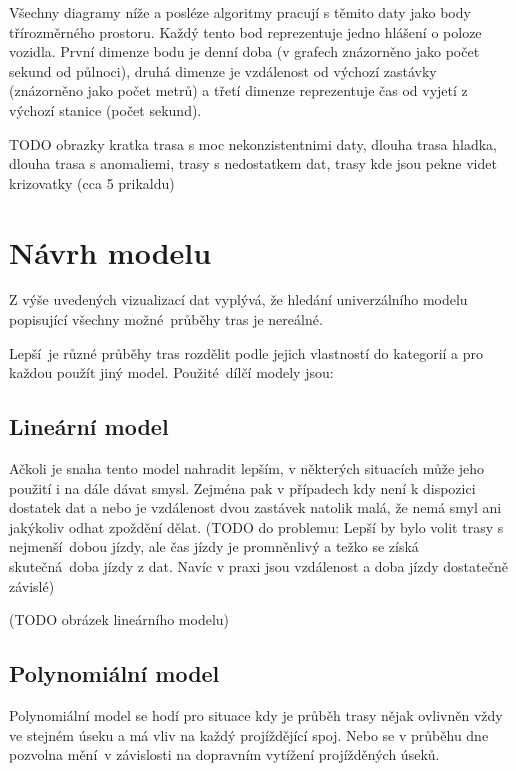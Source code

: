 \bigbreak

Všechny diagramy níže a posléze algoritmy pracují s těmito daty jako body třírozměrného prostoru. Každý tento bod reprezentuje jedno hlášení o poloze vozidla. První dimenze bodu je denní doba (v grafech znázorněno jako počet sekund od půlnoci), druhá dimenze je vzdálenost od výchozí zastávky (znázorněno jako počet metrů) a třetí dimenze reprezentuje čas od vyjetí z výchozí stanice (počet sekund).

TODO obrazky kratka trasa s moc nekonzistentnimi daty, dlouha trasa hladka, dlouha trasa s anomaliemi, trasy s nedostatkem dat, trasy kde jsou pekne videt krizovatky (cca 5 prikaldu)


\section{Návrh modelu}

Z výše uvedených vizualizací dat vyplývá, že hledání univerzálního modelu popisující všechny možné průběhy tras je nereálné.

\bigbreak

Lepší je různé průběhy tras rozdělit podle jejich vlastností do kategorií a pro každou použít jiný model. Použité dílčí modely jsou:


\subsection{Lineární model}

Ačkoli je snaha tento model nahradit lepším, v některých situacích může jeho použití i na dále dávat smysl. Zejména pak v případech kdy není k dispozici dostatek dat a nebo je vzdálenost dvou zastávek natolik malá, že nemá smyl ani jakýkoliv odhat zpoždění dělat. (TODO do problemu: Lepší by bylo volit trasy s nejmenší dobou jízdy, ale čas jízdy je promněnlivý a težko se získá skutečná doba jízdy z dat. Navíc v praxi jsou vzdálenost a doba jízdy dostatečně závislé)

(TODO obrázek lineárního modelu)


\subsection{Polynomiální model}

Polynomiální model se hodí pro situace kdy je průběh trasy nějak ovlivněn vždy ve stejném úseku a má vliv na každý projíždějící spoj. Nebo se v průběhu dne pozvolna mění v závislosti na dopravním vytížení projížděných úseků.

